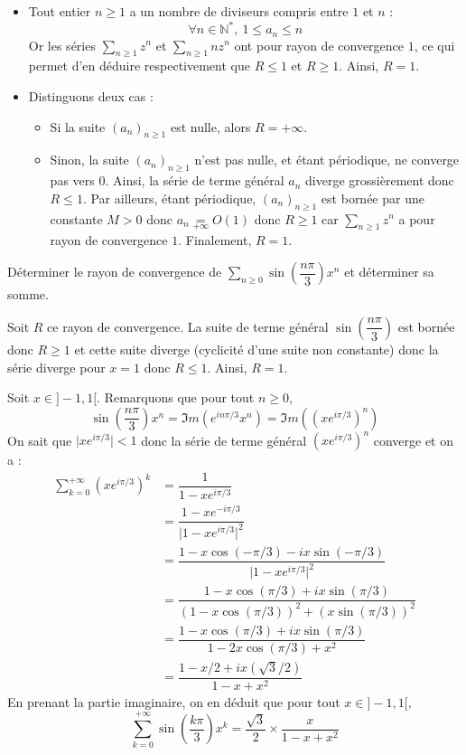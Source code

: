 \documentclass[a4paper,10pt]{report}
\newcommand{\Sum}[2]{\ensuremath{\textstyle{\sum\limits_{#1}^{#2}}}}
\begin{document}
\newpage

\corr 
\begin{itemize}
\item Tout entier $n\geq 1$ a un nombre de diviseurs compris entre $1$ et $n$ :
\[
\forall n\in\mathbb{N}^*,\ 1\leq a_n \leq n
\]
Or les séries $\Sum{n\geq 1}{} z^n$ et $\Sum{n\geq 1}{}n z^n$ ont pour rayon de convergence $1$, ce qui permet d'en déduire respectivement que $R\leq 1$ et $R\geq 1$.  Ainsi, $R=1$.
\item Distinguons deux cas :
\begin{itemize}
\item Si la suite $(a_n)_{n\geq 1}$ est nulle, alors $R=+\infty$.
\item Sinon, la suite $(a_n)_{n\geq 1}$ n'est pas nulle, et étant périodique, ne converge pas vers $0$. Ainsi, la série de terme général $a_n$ diverge grossièrement donc $R\leq 1$. Par ailleurs, étant périodique, $(a_n)_{n\geq 1}$ est bornée par une constante $M>0$ donc $a_n  \underset{+ \infty}{=} O(1)$ donc $R \geq 1$ car $\Sum{n\geq 1}{} z^n$ a pour rayon de convergence $1$. Finalement, $R=1$.
\end{itemize}
\end{itemize}

\begin{Exa}
Déterminer le rayon de convergence de $\Sum{n\geq 0}{} \sin \left( \dfrac{n \pi}{3} \right) x^n$ et déterminer sa somme.
\end{Exa}

\corr Soit $R$ ce rayon de convergence. La suite de terme général $\sin \left( \dfrac{n \pi}{3} \right)$ est bornée donc $R \geq 1$ et cette suite diverge (cyclicité d'une suite non constante) donc la série diverge pour $x=1$ donc $R \leq 1$. Ainsi, $R=1$.

\medskip

\noindent Soit $x \in ]-1,1[$. Remarquons que pour tout $n \geq 0$,
$$ \sin \left( \dfrac{n \pi}{3} \right) x^n = \Im m (e^{in \pi/3} x^n) = \Im m ((xe^{i \pi/3})^n)$$
On sait que $\vert xe^{i \pi/3} \vert <1$ donc la série de terme général $(xe^{i \pi/3})^n$ converge et on a :
\begin{align*}
\sum_{k=0}^{+ \infty} (xe^{i \pi/3})^k & = \dfrac{1}{1-xe^{i \pi/3}} \\
& = \dfrac{1-xe^{-i \pi/3}}{\vert 1-x e^{i \pi/3}\vert^2} \\
& = \dfrac{1-x \cos(-\pi/3)-i x\sin(-\pi/3)}{\vert 1-x e^{i \pi/3}\vert^2} \\
& = \dfrac{1-x \cos(\pi/3)+i x\sin(\pi/3)}{(1-x \cos(\pi/3))^2+ (x\sin(\pi/3))^2} \\
& = \dfrac{1-x \cos(\pi/3)+i x\sin(\pi/3)}{1-2x \cos(\pi/3)+x^2} \\
& = \dfrac{1-x/2 +i x(\sqrt{3}/2)}{1-x+x^2} 
\end{align*}
En prenant la partie imaginaire, on en déduit que pour tout $x \in ]-1,1[$,
$$ \sum_{k=0}^{+ \infty} \sin \left( \dfrac{k \pi}{3} \right) x^k =\dfrac{\sqrt{3}}{2} \times \dfrac{x}{1-x+x^2}$$
\end{document}
